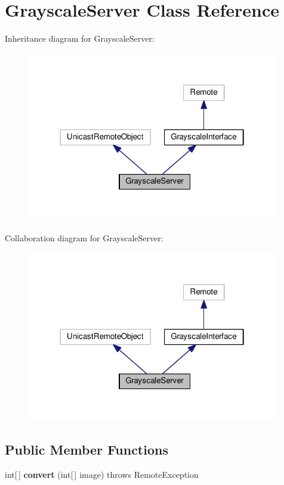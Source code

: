 \hypertarget{classGrayscaleServer}{}\section{Grayscale\+Server Class Reference}
\label{classGrayscaleServer}


Inheritance diagram for Grayscale\+Server\+:
\nopagebreak
\begin{figure}[H]
\begin{center}
\leavevmode
\includegraphics[width=310pt]{classGrayscaleServer__inherit__graph}
\end{center}
\end{figure}


Collaboration diagram for Grayscale\+Server\+:
\nopagebreak
\begin{figure}[H]
\begin{center}
\leavevmode
\includegraphics[width=310pt]{classGrayscaleServer__coll__graph}
\end{center}
\end{figure}
\subsection*{Public Member Functions}
\begin{DoxyCompactItemize}
\item 
int\mbox{[}$\,$\mbox{]} {\bfseries convert} (int\mbox{[}$\,$\mbox{]} image)  throws Remote\+Exception \hypertarget{classGrayscaleServer_a7eb7845b86bad3a7a1c66f6979a3c00b}{}\label{classGrayscaleServer_a7eb7845b86bad3a7a1c66f6979a3c00b}

\end{DoxyCompactItemize}
